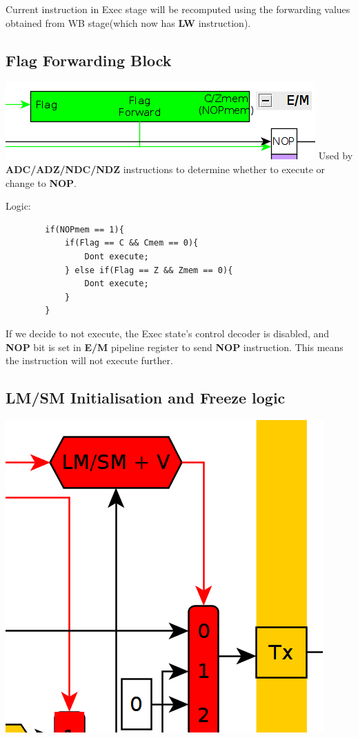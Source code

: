\documentclass{article}
\begin{document}
Current instruction in Exec stage will be recomputed using the forwarding values
obtained from WB stage(which now has \textbf{LW} instruction).

\subsection*{Flag Forwarding Block}

\includegraphics{flag_forward}
Used by \textbf{ADC/ADZ/NDC/NDZ} instructions to determine whether to execute
or change to \textbf{NOP}.

Logic:
    \begin{lstlisting}
        if(NOPmem == 1){
            if(Flag == C && Cmem == 0){
                Dont execute;
            } else if(Flag == Z && Zmem == 0){
                Dont execute;
            }
        }
    \end{lstlisting}

If we decide to not execute, the Exec state's control decoder is disabled, and
\textbf{NOP} bit is set in \textbf{E/M} pipeline register to send \textbf{NOP}
instruction. This means the instruction will not execute further.

\pagebreak
\subsection*{LM/SM Initialisation and Freeze logic}

\includegraphics[scale=0.7]{lm_sm_init}
\end{document}
